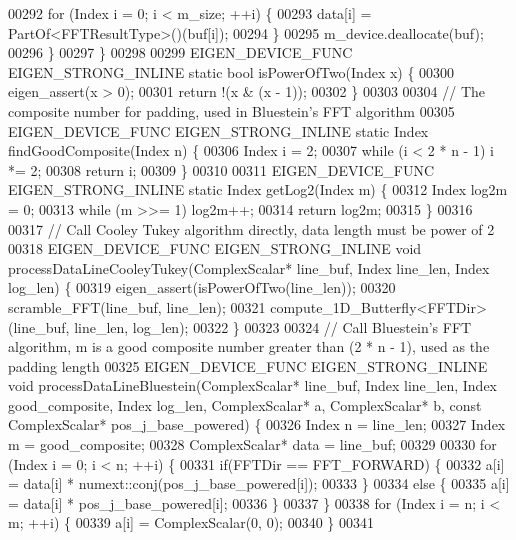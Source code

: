 \begin{DoxyCode}
00292       \textcolor{keywordflow}{for} (Index i = 0; i < m\_size; ++i) \{
00293         data[i] = PartOf<FFTResultType>()(buf[i]);
00294       \}
00295       m\_device.deallocate(buf);
00296     \}
00297   \}
00298 
00299   EIGEN\_DEVICE\_FUNC EIGEN\_STRONG\_INLINE \textcolor{keyword}{static} \textcolor{keywordtype}{bool} isPowerOfTwo(Index x) \{
00300     eigen\_assert(x > 0);
00301     \textcolor{keywordflow}{return} !(x & (x - 1));
00302   \}
00303 
00304   \textcolor{comment}{// The composite number for padding, used in Bluestein's FFT algorithm}
00305   EIGEN\_DEVICE\_FUNC EIGEN\_STRONG\_INLINE \textcolor{keyword}{static} Index findGoodComposite(Index n) \{
00306     Index i = 2;
00307     \textcolor{keywordflow}{while} (i < 2 * n - 1) i *= 2;
00308     \textcolor{keywordflow}{return} i;
00309   \}
00310 
00311   EIGEN\_DEVICE\_FUNC EIGEN\_STRONG\_INLINE \textcolor{keyword}{static} Index getLog2(Index m) \{
00312     Index log2m = 0;
00313     \textcolor{keywordflow}{while} (m >>= 1) log2m++;
00314     \textcolor{keywordflow}{return} log2m;
00315   \}
00316 
00317   \textcolor{comment}{// Call Cooley Tukey algorithm directly, data length must be power of 2}
00318   EIGEN\_DEVICE\_FUNC EIGEN\_STRONG\_INLINE \textcolor{keywordtype}{void} processDataLineCooleyTukey(ComplexScalar* line\_buf, Index 
      line\_len, Index log\_len) \{
00319     eigen\_assert(isPowerOfTwo(line\_len));
00320     scramble\_FFT(line\_buf, line\_len);
00321     compute\_1D\_Butterfly<FFTDir>(line\_buf, line\_len, log\_len);
00322   \}
00323 
00324   \textcolor{comment}{// Call Bluestein's FFT algorithm, m is a good composite number greater than (2 * n - 1), used as the
       padding length}
00325   EIGEN\_DEVICE\_FUNC EIGEN\_STRONG\_INLINE \textcolor{keywordtype}{void} processDataLineBluestein(ComplexScalar* line\_buf, Index 
      line\_len, Index good\_composite, Index log\_len, ComplexScalar* a, ComplexScalar* b, \textcolor{keyword}{const} ComplexScalar* 
      pos\_j\_base\_powered) \{
00326     Index n = line\_len;
00327     Index m = good\_composite;
00328     ComplexScalar* data = line\_buf;
00329 
00330     \textcolor{keywordflow}{for} (Index i = 0; i < n; ++i) \{
00331       \textcolor{keywordflow}{if}(FFTDir == FFT\_FORWARD) \{
00332         a[i] = data[i] * numext::conj(pos\_j\_base\_powered[i]);
00333       \}
00334       \textcolor{keywordflow}{else} \{
00335         a[i] = data[i] * pos\_j\_base\_powered[i];
00336       \}
00337     \}
00338     \textcolor{keywordflow}{for} (Index i = n; i < m; ++i) \{
00339       a[i] = ComplexScalar(0, 0);
00340     \}
00341 

\end{DoxyCode}
